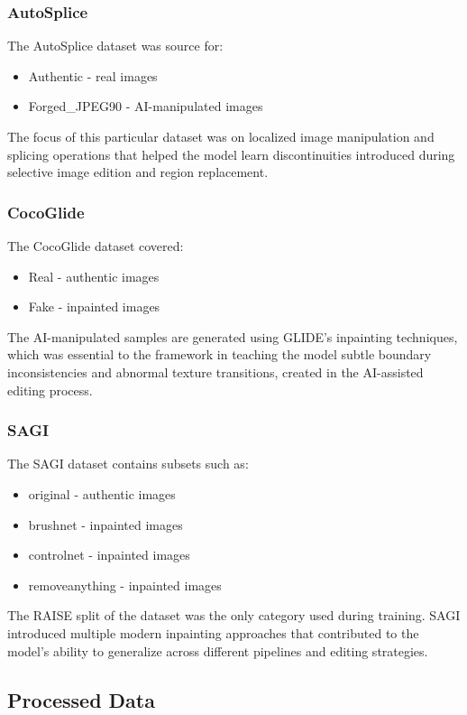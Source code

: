 \subsubsection{AutoSplice}
The AutoSplice dataset \cite{jia2023autosplice} was source for:
\begin{itemize}
  \item{Authentic - real images}
  \item{Forged\_JPEG90 - AI-manipulated images}
\end{itemize}
The focus of this particular dataset was on localized image manipulation and
splicing operations that helped the model learn discontinuities introduced
during selective image edition and region replacement.

\subsubsection{CocoGlide}
The CocoGlide dataset \cite{guillaro2023cocoglide} covered:
\begin{itemize}
  \item{Real - authentic images}
  \item{Fake - inpainted images}
\end{itemize}
The AI-manipulated samples are generated using GLIDE's inpainting techniques,
which was essential to the framework in teaching the model subtle boundary
inconsistencies and abnormal texture transitions, created in the AI-assisted
editing process.

\subsubsection{SAGI}
The SAGI dataset \cite{giakoumoglou2025sagi} contains subsets such as:
\begin{itemize}
  \item{original - authentic images}
  \item{brushnet - inpainted images}
  \item{controlnet - inpainted images}
  \item{removeanything - inpainted images}
\end{itemize}
The RAISE split of the dataset was the only category used during training. SAGI
introduced multiple modern inpainting approaches that contributed to the model's
ability to generalize across different pipelines and editing strategies.

\subsection{Processed Data} \label{subsection:processed}

